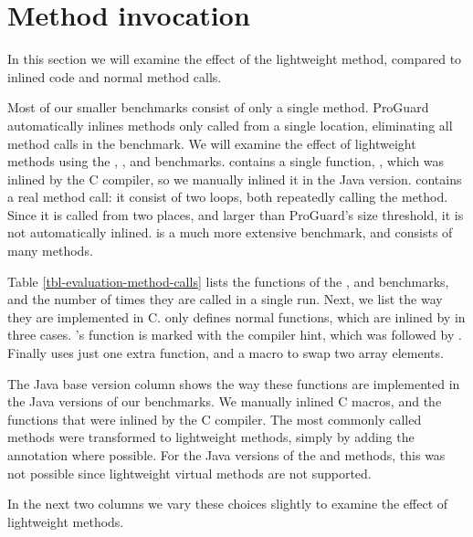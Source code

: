 \section{Method invocation}
\label{sec-evaluation-method-invocation}


In this section we will examine the effect of the lightweight method, compared to inlined code and normal method calls.

Most of our smaller benchmarks consist of only a single method. ProGuard automatically inlines methods only called from a single location, eliminating all method calls in the  benchmark. We will examine the effect of lightweight methods using the , , and  benchmarks.
 contains a single function, , which was inlined by the C compiler, so we manually inlined it in the Java version.  contains a real method call: it consist of two loops, both repeatedly calling the  method. Since it is called from two places, and larger than ProGuard's size threshold, it is not automatically inlined.  is a much more extensive benchmark, and consists of many methods.

Table \ref{tbl-evaluation-method-calls} lists the functions of the ,  and  benchmarks, and the number of times they are called in a single run. Next, we list the way they are implemented in C.  only defines normal functions, which are inlined by  in three cases. 's  function is marked with the  compiler hint, which was followed by . Finally  uses just one extra function, and a macro to swap two array elements.

The Java base version column shows the way these functions are implemented in the Java versions of our benchmarks. We manually inlined C macros, and the functions that were inlined by the C compiler. The most commonly called methods were transformed to lightweight methods, simply by adding the  annotation where possible. For the Java versions of the  and  methods, this was not possible since lightweight virtual methods are not supported.

In the next two columns we vary these choices slightly to examine the effect of lightweight methods.

